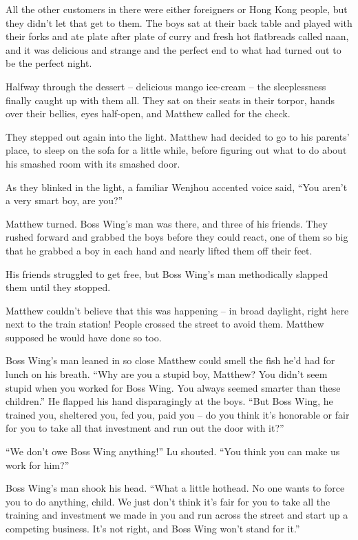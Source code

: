All the other customers in there were either foreigners or Hong
Kong people, but they didn't let that get to them. The boys sat at
their back table and played with their forks and ate plate after
plate of curry and fresh hot flatbreads called naan, and it was
delicious and strange and the perfect end to what had turned out to
be the perfect night.

Halfway through the dessert -- delicious mango ice-cream -- the
sleeplessness finally caught up with them all. They sat on their
seats in their torpor, hands over their bellies, eyes half-open,
and Matthew called for the check.

They stepped out again into the light. Matthew had decided to go to
his parents' place, to sleep on the sofa for a little while, before
figuring out what to do about his smashed room with its smashed
door.

As they blinked in the light, a familiar Wenjhou accented voice
said, ``You aren't a very smart boy, are you?''

Matthew turned. Boss Wing's man was there, and three of his
friends. They rushed forward and grabbed the boys before they could
react, one of them so big that he grabbed a boy in each hand and
nearly lifted them off their feet.

His friends struggled to get free, but Boss Wing's man methodically
slapped them until they stopped.

Matthew couldn't believe that this was happening -- in broad
daylight, right here next to the train station! People crossed the
street to avoid them. Matthew supposed he would have done so too.

Boss Wing's man leaned in so close Matthew could smell the fish
he'd had for lunch on his breath. ``Why are you a stupid boy,
Matthew? You didn't seem stupid when you worked for Boss Wing. You
always seemed smarter than these children.'' He flapped his hand
disparagingly at the boys. ``But Boss Wing, he trained you,
sheltered you, fed you, paid you -- do you think it's honorable or
fair for you to take all that investment and run out the door with
it?''

``We don't owe Boss Wing anything!'' Lu shouted. ``You think you can
make us work for him?''

Boss Wing's man shook his head. ``What a little hothead. No one
wants to force you to do anything, child. We just don't think it's
fair for you to take all the training and investment we made in you
and run across the street and start up a competing business. It's
not right, and Boss Wing won't stand for it.''

